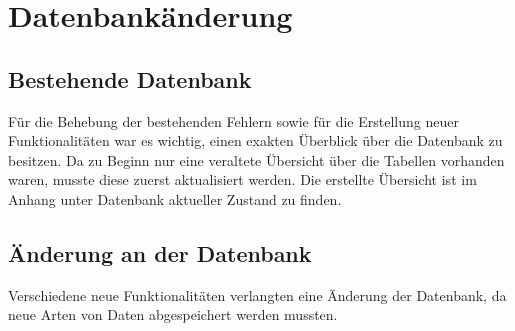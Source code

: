 

\section{Datenbankänderung}

\subsection{Bestehende Datenbank}

Für die Behebung der bestehenden Fehlern sowie für die Erstellung neuer Funktionalitäten war es wichtig, einen exakten Überblick über die Datenbank zu besitzen. Da zu Beginn nur eine veraltete Übersicht über die Tabellen vorhanden waren, musste diese zuerst aktualisiert werden. Die erstellte Übersicht ist im Anhang unter \glqq Datenbank aktueller Zustand \grqq zu finden.



\subsection{Änderung an der Datenbank}
Verschiedene neue Funktionalitäten verlangten eine Änderung der Datenbank, da neue Arten von Daten abgespeichert werden mussten.



